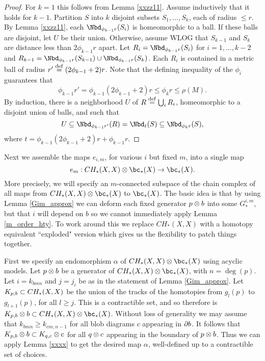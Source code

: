 \begin{proof}
For $k=1$ this follows from Lemma \ref{xxzz11}.
Assume inductively that it holds for $k-1$.
Partition $S$ into $k$ disjoint subsets $S_1,\ldots,S_k$, each of radius $\le r$.
By Lemma \ref{xxzz11}, each $\Nbd_{\phi_{k-1} r}(S_i)$ is homeomorphic to a ball.
If these balls are disjoint, let $U$ be their union.
Otherwise, assume WLOG that $S_{k-1}$ and $S_k$ are distance less than $2\phi_{k-1}r$ apart.
Let $R_i = \Nbd_{\phi_{k-1} r}(S_i)$ for $i = 1,\ldots,k-2$ 
and $R_{k-1} = \Nbd_{\phi_{k-1} r}(S_{k-1})\cup \Nbd_{\phi_{k-1} r}(S_k)$.
Each $R_i$ is contained in a metric ball of radius $r' \stackrel{\mathrm{def}}{=} (2\phi_{k-1}+2)r$.
Note that the defining inequality of the $\phi_i$ guarantees that
\[
	\phi_{k-1}r' = \phi_{k-1}(2\phi_{k-1}+2)r \le \phi_k r \le \rho(M) .
\]
By induction, there is a neighborhood $U$ of $R \stackrel{\mathrm{def}}{=} \bigcup_i R_i$, 
homeomorphic to a disjoint union
of balls, and such that
\[
	U \subeq \Nbd_{\phi_{k-1}r'}(R) = \Nbd_{t}(S) \subeq \Nbd_{\phi_k r}(S) ,
\]
where $t = \phi_{k-1}(2\phi_{k-1}+2)r + \phi_{k-1} r$.
\end{proof}

\medskip

Next we assemble the maps $e_{i,m}$, for various $i$ but fixed $m$, into a single map 
\[
	e_m: CH_*(X, X) \otimes \bc_*(X) \to \bc_*(X) .
\]
More precisely, we will specify an $m$-connected subspace of the chain complex
of all maps from $CH_*(X, X) \otimes \bc_*(X)$ to $\bc_*(X)$.
The basic idea is that by using Lemma \ref{Gim_approx} we can deform
each fixed generator $p\otimes b$ into some $G^{i,m}_*$, but that $i$ will depend on $b$
so we cannot immediately apply Lemma \ref{m_order_hty}.
To work around this we replace $CH_*(X, X)$ with a homotopy equivalent ``exploded" version
which gives us the flexibility to patch things together.

First we specify an endomorphism $\alpha$ of $CH_*(X, X) \otimes \bc_*(X)$ using acyclic models.
Let $p\otimes b$ be a generator of $CH_*(X, X) \otimes \bc_*(X)$, with $n = \deg(p)$.
Let $i = k_{bmn}$ and $j = j_i$ be as in the statement of Lemma \ref{Gim_approx}.
Let $K_{p,b} \subset CH_*(X, X)$ be the union of the tracks of the homotopies from $g_l(p)$ to 
$g_{l+1}(p)$, for all $l \ge j$.
This is a contractible set, and so therefore is $K_{p,b}\ot b \sub CH_*(X, X) \otimes \bc_*(X)$.
Without loss of generality we may assume that $k_{bmn} \ge k_{cm,n-1}$ for all blob diagrams $c$ appearing in $\partial b$.
It follows that $K_{p,b}\otimes b \subset K_{q,c}\otimes c$ for all $q\otimes c$ 
appearing in the boundary of $p\otimes b$.
Thus we can apply Lemma \ref{xxxx} 
to get the desired map $\alpha$, well-defined up to a contractible set of choices.

